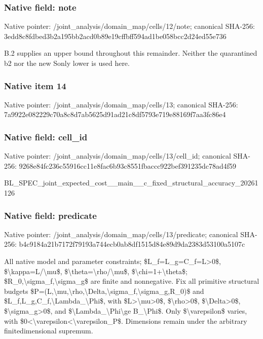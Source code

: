 \documentclass[10pt,a4paper]{article}
\begin{document}
\subsubsection{Native field: note}


Native pointer: /joint\_analysis/domain\_m\allowbreak{}ap/cells/12/note; canonical SHA-256: 3edd8c8fdbed3b2a195bb2ac\allowbreak{}d0b89e19cffbff594ad1be05\allowbreak{}8bcc2d24ed55e736


B.2 supplies an upper bound throughout this remainder. Neither the quarantined b2 nor the new Sonly lower is used here.


\subsubsection{Native item 14}


Native pointer: /joint\_analysis/domain\_map/cells/13; canonical SHA-256: 7a9922e082229c70a8c8d7ab\allowbreak{}5625d91ad21c8df5793e719e\allowbreak{}88169f7aa3fc86e4



\subsubsection{Native field: cell\_id}


Native pointer: /joint\_analysis/domain\_m\allowbreak{}ap/cells/13/cell\_id; canonical SHA-256: 9268e84fc236c55916cc11e8\allowbreak{}fac6b93c8551fbaccc922bef\allowbreak{}391235dc78ad4f59


BL\_SPEC\_joint\_expected\_c\allowbreak{}ost\_\_main\_\_c\_fixed\_struc\allowbreak{}tural\_accuracy\_20261126


\subsubsection{Native field: predicate}


Native pointer: /joint\_analysis/domain\_m\allowbreak{}ap/cells/13/predicate; canonical SHA-256: b4c9184a21b7172f79193a74\allowbreak{}4ecb0ab8df1515d84e89d9da\allowbreak{}2383d53100a5107c


All native model and parameter constraints; \$L\_f=L\_g=C\_f=L>0\$, \$\textbackslash{}kappa=L/\textbackslash{}mu\$, \$\textbackslash{}theta=\textbackslash{}rho/\textbackslash{}mu\$, \$\textbackslash{}chi=1+\textbackslash{}theta\$; \$R\_0,\textbackslash{}sigma\_f,\textbackslash{}sigma\_g\$ are finite and nonnegative. Fix all primitive structural budgets \$P=(L,\textbackslash{}mu,\textbackslash{}rho,\textbackslash{}Delta,\textbackslash{}s\allowbreak{}igma\_f,\textbackslash{}sigma\_g,R\_0)\$ and \$L\_f,L\_g,C\_f,\textbackslash{}Lambda\_\textbackslash{}Phi\$, with \$L>\textbackslash{}mu>0\$, \$\textbackslash{}rho>0\$, \$\textbackslash{}Delta>0\$, \$\textbackslash{}sigma\_g>0\$, and \$\textbackslash{}Lambda\_\textbackslash{}Phi\textbackslash{}ge B\_\textbackslash{}Phi\$. Only \$\textbackslash{}varepsilon\$ varies, with \$0<\textbackslash{}varepsilon<\textbackslash{}varepsilon\_P\$. Dimensions remain under the arbitrary finitedimensional supremum.
\end{document}
